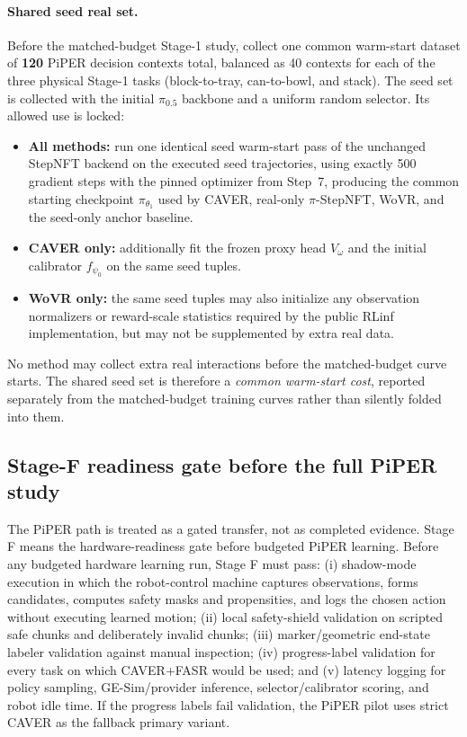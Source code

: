 \documentclass[10pt]{article}
\theoremstyle{plain}
\theoremstyle{definition}
\theoremstyle{remark}
\begin{document}
\paragraph{Shared seed real set.}
Before the matched-budget Stage-1 study, collect one common warm-start dataset of \textbf{120} PiPER decision contexts total, balanced as 40 contexts for each of the three physical Stage-1 tasks (block-to-tray, can-to-bowl, and stack). The seed set is collected with the initial $\pi_{0.5}$ backbone and a uniform random selector. Its allowed use is locked:
\begin{itemize}
    \item \textbf{All methods:} run one identical seed warm-start pass of the unchanged StepNFT backend on the executed seed trajectories, using exactly 500 gradient steps with the pinned optimizer from Step~7, producing the common starting checkpoint $\pi_{\theta_1}$ used by CAVER, real-only $\pi$-StepNFT, WoVR, and the seed-only anchor baseline.
    \item \textbf{CAVER only:} additionally fit the frozen proxy head $V_{\omega}$ and the initial calibrator $f_{\psi_0}$ on the same seed tuples.
    \item \textbf{WoVR only:} the same seed tuples may also initialize any observation normalizers or reward-scale statistics required by the public RLinf implementation, but may not be supplemented by extra real data.
\end{itemize}
No method may collect extra real interactions before the matched-budget curve starts. The shared seed set is therefore a \emph{common warm-start cost}, reported separately from the matched-budget training curves rather than silently folded into them.

\subsection{Stage-F readiness gate before the full PiPER study}
The PiPER path is treated as a gated transfer, not as completed evidence. Stage F means the hardware-readiness gate before budgeted PiPER learning. Before any budgeted hardware learning run, Stage F must pass: (i) shadow-mode execution in which the robot-control machine captures observations, forms candidates, computes safety masks and propensities, and logs the chosen action without executing learned motion; (ii) local safety-shield validation on scripted safe chunks and deliberately invalid chunks; (iii) marker/geometric end-state labeler validation against manual inspection; (iv) progress-label validation for every task on which CAVER+FASR would be used; and (v) latency logging for policy sampling, GE-Sim/provider inference, selector/calibrator scoring, and robot idle time. If the progress labels fail validation, the PiPER pilot uses strict CAVER as the fallback primary variant.
\end{document}
